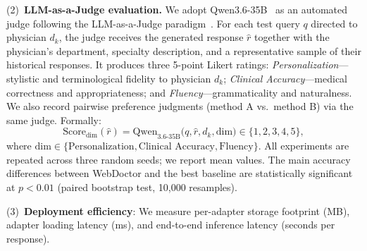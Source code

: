 (2)~\textbf{LLM-as-a-Judge evaluation.} We adopt Qwen3.6-35B~\cite{qwen36_35b_a3b} as an automated judge following the LLM-as-a-Judge paradigm~\cite{NEURIPS2023_91f18a12,chenGMAIMMBenchComprehensiveMultimodal2024}. For each test query $q$ directed to physician $d_k$, the judge receives the generated response $\hat{r}$ together with the physician's department, specialty description, and a representative sample of their historical responses. It produces three 5-point Likert ratings:
\emph{Personalization}---stylistic and terminological fidelity to physician $d_k$; \emph{Clinical Accuracy}---medical correctness and appropriateness; and \emph{Fluency}---grammaticality and naturalness. We also record pairwise preference judgments (method A vs.\ method B) via the same judge. Formally:
\begin{equation}
\mathrm{Score}_{\mathrm{dim}}(\hat{r}) = \mathrm{Qwen}_{3.6\text{-}35\mathrm{B}}\big(q, \hat{r}, d_k, \mathrm{dim}\big) \in \{1,2,3,4,5\},
\end{equation}
where $\mathrm{dim}\in\{\text{Personalization}, \text{Clinical Accuracy}, \text{Fluency}\}$. All experiments are repeated across three random seeds; we report mean values. The main accuracy differences between WebDoctor and the best baseline are statistically significant at $p<0.01$ (paired bootstrap test, 10,000 resamples).

(3)~\textbf{Deployment efficiency}: We measure per-adapter storage footprint (MB), adapter loading latency (ms), and end-to-end inference latency (seconds per response).

